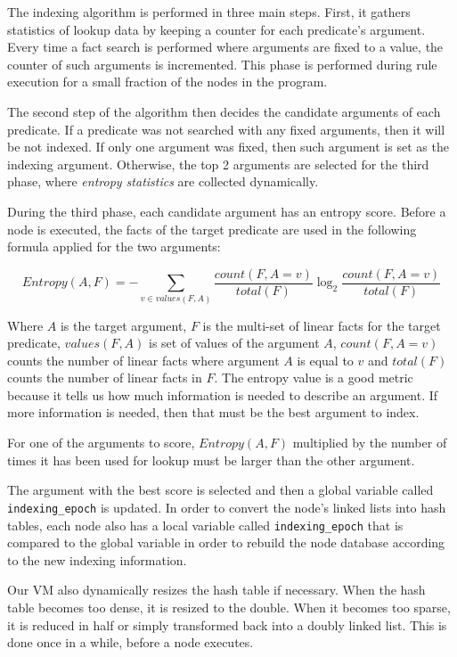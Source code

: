 The indexing algorithm is performed in three main steps. First, it gathers statistics of lookup data by keeping a counter
for each predicate's argument.
Every time a fact search is performed where arguments are fixed to a value, the counter of such arguments is incremented. This phase is performed during rule execution for a small fraction of the nodes in the program.

The second step of the algorithm then decides the candidate arguments of each predicate.
If a predicate was not searched with any fixed arguments, then it will be not indexed.
If only one argument was fixed, then such argument is set as the indexing argument. Otherwise, the top 2 arguments
are selected for the third phase, where \emph{entropy statistics} are collected dynamically.

During the third phase, each candidate argument has an entropy score.
Before a node is executed, the facts of the target predicate
are used in the following formula applied for the two arguments:

\vspace{-0.5\intextsep}

\[
Entropy(A, F) = - \sum_{v \in values(F, A)} \frac{count(F, A = v)}{total(F)} 	\log_2 \frac{count(F, A = v)}{total(F)}
\]
\vspace{-0.5\intextsep}

Where $A$ is the target argument, $F$ is the multi-set of linear facts for the target predicate, $values(F, A)$ is set of values of the argument $A$, $count(F, A = v)$ counts the number
of linear facts where argument $A$ is equal to $v$ and $total(F)$ counts the number of linear facts in $F$.
The entropy value is a good metric because it tells us how much information is needed to describe an argument.
If more information is needed, then that must be the best argument to index.

For one of the arguments to score, $Entropy(A, F)$ multiplied by the number of times it has been used for lookup must be larger than the other argument.

The argument with the best score is selected and then
a global variable called \texttt{indexing\_epoch} is updated.
In order to convert the node's linked lists into hash tables, each node also has a local variable called \texttt{indexing\_epoch}
that is compared to the global variable in order to rebuild the node database according to the new indexing
information.

Our VM also dynamically resizes the hash table if necessary. When the hash table becomes
too dense, it is resized to the double. When it becomes too sparse, it is reduced in half
or simply transformed back into a doubly linked list. This is done once in a while, before a node executes.


